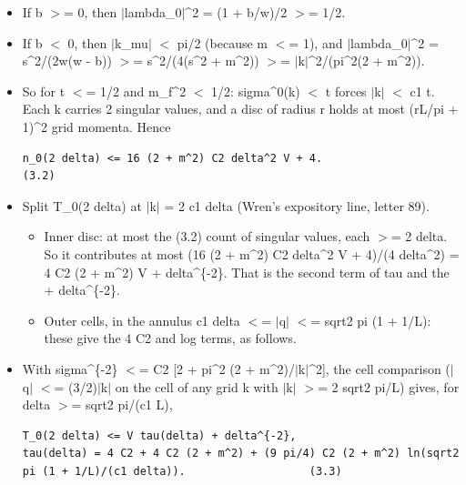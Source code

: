 \documentclass[11pt,a4paper]{article}
\begin{document}
\begin{itemize}
\item{} If b $>$= 0, then $|$lambda\_0$|$\textasciicircum{}2 = (1 + b/w)/2 $>$= 1/2.
\item{} If b $<$ 0, then $|$k\_mu$|$ $<$ pi/2 (because m $<$= 1), and $|$lambda\_0$|$\textasciicircum{}2 = s\textasciicircum{}2/(2w(w - b)) $>$= s\textasciicircum{}2/(4(s\textasciicircum{}2 + m\textasciicircum{}2)) $>$=
$|$k$|$\textasciicircum{}2/(pi\textasciicircum{}2(2 + m\textasciicircum{}2)).
\item{} So for t $<$= 1/2 and m\_f\textasciicircum{}2 $<$ 1/2: sigma\textasciicircum{}0(k) $<$ t forces $|$k$|$ $<$ c1 t. Each k carries 2 singular values, and a disc of
radius r holds at most (rL/pi + 1)\textasciicircum{}2 grid momenta. Hence
\begin{Verbatim}[breaklines=true,breakanywhere=true,fontsize=\small]
n_0(2 delta) <= 16 (2 + m^2) C2 delta^2 V + 4.                                                                  (3.2)
\end{Verbatim}

\item{} Split T\_0(2 delta) at $|$k$|$ = 2 c1 delta (Wren's expository line, letter 89).
\begin{itemize}
\item{} Inner disc: at most the (3.2) count of singular values, each $>$= 2 delta. So it contributes at most
(16 (2 + m\textasciicircum{}2) C2 delta\textasciicircum{}2 V + 4)/(4 delta\textasciicircum{}2) = 4 C2 (2 + m\textasciicircum{}2) V + delta\textasciicircum{}\{-2\}. That is the second term of tau and
the + delta\textasciicircum{}\{-2\}.
\item{} Outer cells, in the annulus c1 delta $<$= $|$q$|$ $<$= sqrt2 pi (1 + 1/L): these give the 4 C2 and log terms, as follows.
\end{itemize}

\item{} With sigma\textasciicircum{}\{-2\} $<$= C2 [2 + pi\textasciicircum{}2 (2 + m\textasciicircum{}2)/$|$k$|$\textasciicircum{}2], the cell comparison ($|$q$|$ $<$= (3/2)$|$k$|$ on the cell of any grid k
with $|$k$|$ $>$= 2 sqrt2 pi/L) gives, for delta $>$= sqrt2 pi/(c1 L),
\begin{Verbatim}[breaklines=true,breakanywhere=true,fontsize=\small]
T_0(2 delta) <= V tau(delta) + delta^{-2},
tau(delta) = 4 C2 + 4 C2 (2 + m^2) + (9 pi/4) C2 (2 + m^2) ln(sqrt2 pi (1 + 1/L)/(c1 delta)).                   (3.3)
\end{Verbatim}


\end{itemize}
\end{document}
